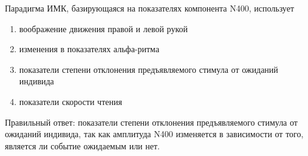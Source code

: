 
Парадигма ИМК, базирующаяся на показателях компонента N400, использует

\begin{enumerate}
    \item воображение движения правой и левой рукой
    \item изменения в показателях альфа-ритма
    \item показатели степени отклонения предъявляемого стимула от ожиданий индивида
    \item показатели скорости чтения
\end{enumerate}

\explanationSection

Правильный ответ: показатели степени отклонения предъявляемого стимула от ожиданий индивида, так как амплитуда N400 изменяется в зависимости от того, является ли событие ожидаемым или нет.

